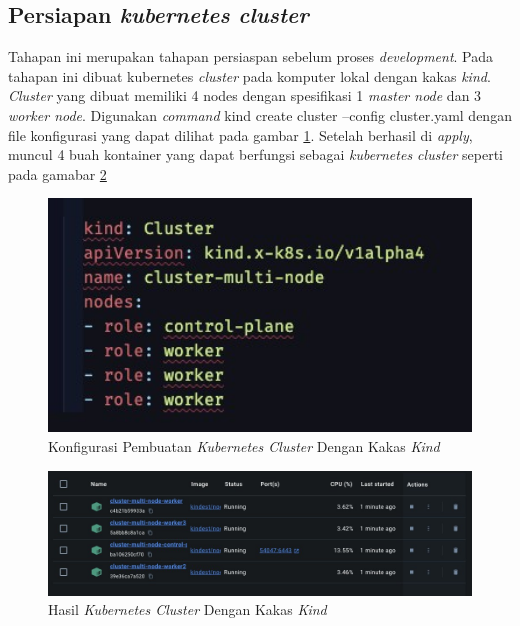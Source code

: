 \subsection{Persiapan \textit{kubernetes cluster}}
\label{subsec:persiapan-kubernetes-cluster}

Tahapan ini merupakan tahapan persiaspan sebelum proses \textit{development}. Pada tahapan ini dibuat kubernetes \textit{cluster} pada komputer lokal dengan kakas \textit{kind}. \textit{Cluster} yang dibuat memiliki 4 nodes dengan spesifikasi 1 \textit{master node} dan 3 \textit{worker node}. Digunakan \textit{command} kind create cluster --config cluster.yaml dengan file konfigurasi yang dapat dilihat pada gambar \ref{fig:konfigurasi-pembuatan-cluster}. Setelah berhasil di \textit{apply}, muncul 4 buah kontainer yang dapat berfungsi sebagai \textit{kubernetes cluster} seperti pada gamabar \ref{fig:hasil-cluster-kind}

\begin{figure}[ht]
  \centering
  \includegraphics[width=1\textwidth]{resources/appendix/pembuatan-cluster.jpg}
  \caption{Konfigurasi Pembuatan \textit{Kubernetes Cluster} Dengan Kakas \textit{Kind}}
  \label{fig:konfigurasi-pembuatan-cluster}
\end{figure}

\begin{figure}[ht]
  \centering
  \includegraphics[width=1\textwidth]{resources/chapter-4/cluster-kind.jpg}
  \caption{Hasil \textit{Kubernetes Cluster} Dengan Kakas \textit{Kind}}
  \label{fig:hasil-cluster-kind}
\end{figure}

\pagebreak